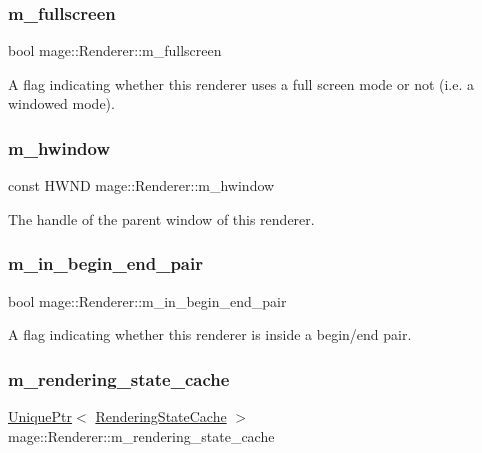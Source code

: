 \subsubsection{\texorpdfstring{m\+\_\+fullscreen}{m\_fullscreen}}
{\footnotesize\ttfamily bool mage\+::\+Renderer\+::m\+\_\+fullscreen\hspace{0.3cm}{\ttfamily [private]}}

A flag indicating whether this renderer uses a full screen mode or not (i.\+e. a windowed mode). \hypertarget{classmage_1_1_renderer_adadc1028e5ad6551abbecfd8529e4aa1}{}\label{classmage_1_1_renderer_adadc1028e5ad6551abbecfd8529e4aa1} 
\subsubsection{\texorpdfstring{m\+\_\+hwindow}{m\_hwindow}}
{\footnotesize\ttfamily const H\+W\+ND mage\+::\+Renderer\+::m\+\_\+hwindow\hspace{0.3cm}{\ttfamily [private]}}

The handle of the parent window of this renderer. \hypertarget{classmage_1_1_renderer_a3caa1bad6cbfde8f87f807e5c97924e3}{}\label{classmage_1_1_renderer_a3caa1bad6cbfde8f87f807e5c97924e3} 
\subsubsection{\texorpdfstring{m\+\_\+in\+\_\+begin\+\_\+end\+\_\+pair}{m\_in\_begin\_end\_pair}}
{\footnotesize\ttfamily bool mage\+::\+Renderer\+::m\+\_\+in\+\_\+begin\+\_\+end\+\_\+pair\hspace{0.3cm}{\ttfamily [private]}}

A flag indicating whether this renderer is inside a begin/end pair. \hypertarget{classmage_1_1_renderer_a3d9f823ecef314a974c4cdb3a71a1853}{}\label{classmage_1_1_renderer_a3d9f823ecef314a974c4cdb3a71a1853} 
\subsubsection{\texorpdfstring{m\+\_\+rendering\+\_\+state\+\_\+cache}{m\_rendering\_state\_cache}}
{\footnotesize\ttfamily \hyperlink{namespacemage_a3316d7143a973e37adf1110f2e80ca31}{Unique\+Ptr}$<$ \hyperlink{structmage_1_1_rendering_state_cache}{Rendering\+State\+Cache} $>$ mage\+::\+Renderer\+::m\+\_\+rendering\+\_\+state\+\_\+cache\hspace{0.3cm}{\ttfamily [private]}}


